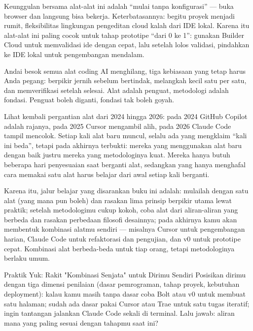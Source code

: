 Keunggulan bersama alat-alat ini adalah “mulai tanpa konfigurasi” — buka browser dan langsung bisa bekerja. Keterbatasannya: begitu proyek menjadi rumit, fleksibilitas lingkungan pengeditan cloud kalah dari IDE lokal. Karena itu alat-alat ini paling cocok untuk tahap prototipe “dari 0 ke 1”: gunakan Builder Cloud untuk memvalidasi ide dengan cepat, lalu setelah lolos validasi, pindahkan ke IDE lokal untuk pengembangan mendalam.


Andai besok semua alat coding AI menghilang, tiga kebiasaan yang tetap harus Anda pegang: berpikir jernih sebelum bertindak, melangkah kecil satu per satu, dan memverifikasi setelah selesai. Alat adalah penguat, metodologi adalah fondasi. Penguat boleh diganti, fondasi tak boleh goyah.

Lihat kembali pergantian alat dari 2024 hingga 2026: pada 2024 GitHub Copilot adalah rajanya, pada 2025 Cursor mengambil alih, pada 2026 Claude Code tampil mencolok. Setiap kali alat baru muncul, selalu ada yang mengklaim “kali ini beda”, tetapi pada akhirnya terbukti: mereka yang menggunakan alat baru dengan baik justru mereka yang metodologinya kuat. Mereka hanya butuh beberapa hari penyesuaian saat berganti alat, sedangkan yang hanya menghafal cara memakai satu alat harus belajar dari awal setiap kali berganti.

Karena itu, jalur belajar yang disarankan buku ini adalah: mulailah dengan satu alat (yang mana pun boleh) dan rasakan lima prinsip berpikir utama lewat praktik; setelah metodologimu cukup kokoh, coba alat dari aliran-aliran yang berbeda dan rasakan perbedaan filosofi desainnya; pada akhirnya kamu akan membentuk kombinasi alatmu sendiri — misalnya Cursor untuk pengembangan harian, Claude Code untuk refaktorasi dan pengujian, dan v0 untuk prototipe cepat. Kombinasi alat berbeda-beda untuk tiap orang, tetapi metodologinya berlaku umum.

\begin{tcbpractice}{Praktik Yuk: Rakit "Kombinasi Senjata" untuk Dirimu Sendiri}
Posisikan dirimu dengan tiga dimensi penilaian (dasar pemrograman, tahap proyek, kebutuhan deployment): kalau kamu masih tanpa dasar coba Bolt atau v0 untuk membuat satu halaman; sudah ada dasar pakai Cursor atau Trae untuk satu tugas iteratif; ingin tantangan jalankan Claude Code sekali di terminal. Lalu jawab: aliran mana yang paling sesuai dengan tahapmu saat ini?

\end{tcbpractice}

